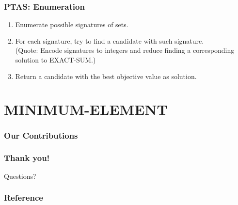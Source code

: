 \documentclass{beamer}
\newcommand{\ES}{{\textsf{EXACT-SUM}}}
\begin{document}
\begin{frame}
    \frametitle{PTAS: Enumeration}
    \begin{enumerate}
        \item Enumerate possible signatures of sets.
        \item For each signature, try to find a candidate with such signature.\\
            (Quote: Encode signatures to integers and reduce finding a corresponding solution to \ES.)
        \item Return a candidate with the best objective value as solution.
    \end{enumerate}
\end{frame}

\section{MINIMUM-ELEMENT}
\begin{frame}
\frametitle{Our Contributions}
\begin{theorem}
\end{theorem}
\end{frame}

\begin{frame}\frametitle{Thank you!}
Questions?
\end{frame}

\begin{frame}\frametitle{Reference}


\end{frame}
\end{document}
